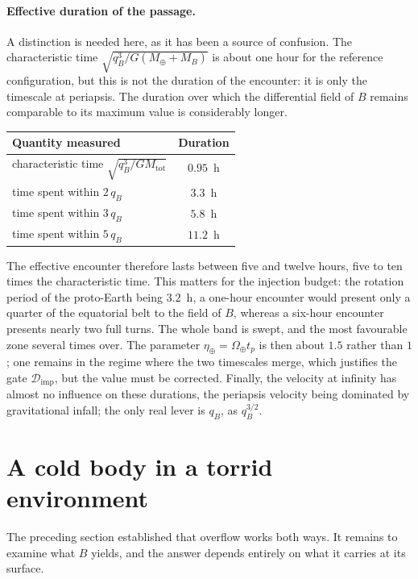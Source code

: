 \documentclass[11pt,a4paper,openany]{report}
\newcommand{\Mt}{M_{\oplus}}
\begin{document}
\paragraph{Effective duration of the passage.}\label{par:duree} A distinction is needed here, as it has been a source
of confusion. The characteristic time $\sqrt{q_B^{3}/G(\Mt+M_B)}$ is about one hour for the
reference configuration, but this is not the duration of the encounter: it is only the timescale at
periapsis. The duration over which the differential field of $B$ remains comparable to its maximum
value is considerably longer.

\begin{center}
\begin{tabular}{lc}
\toprule
\textbf{Quantity measured} & \textbf{Duration} \\
\midrule
characteristic time $\sqrt{q_B^{3}/G M_{\mathrm{tot}}}$ & $0.95$~h \\
time spent within $2\,q_B$ & $3.3$~h \\
time spent within $3\,q_B$ & $5.8$~h \\
time spent within $5\,q_B$ & $11.2$~h \\
\bottomrule
\end{tabular}
\end{center}

The effective encounter therefore lasts between five and twelve hours, five to ten times the
characteristic time. This matters for the injection budget: the rotation period of the proto-Earth
being $3.2$~h, a one-hour encounter would present only a quarter of the equatorial belt to the field
of $B$, whereas a six-hour encounter presents nearly two full turns. The whole band is swept, and
the most favourable zone several times over. The parameter
$\eta_\oplus=\Omega_\oplus t_{p}$ is then about $1.5$ rather than $1$; one remains in the
regime where the two timescales merge, which justifies the gate $\mathcal{D}_{\mathrm{imp}}$, but
the value must be corrected. Finally, the velocity at infinity has almost no influence on these
durations, the periapsis velocity being dominated by gravitational infall; the only real lever is
$q_B$, as $q_B^{3/2}$.



\section{A cold body in a torrid environment}
\label{sec:eau}

The preceding section established that overflow works both ways. It remains to examine what $B$
yields, and the answer depends entirely on what it carries at its surface.
\end{document}
